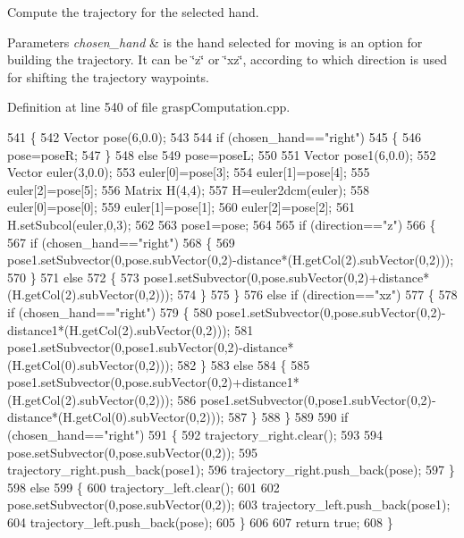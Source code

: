 Compute the trajectory for the selected hand. 


\begin{DoxyParams}{Parameters}
{\em chosen\+\_\+hand} & is the hand selected for moving  is an option for building the trajectory. It can be \char`\"{}z\char`\"{} or \char`\"{}xz\char`\"{}, according to which direction is used for shifting the trajectory waypoints. \\
\hline
\end{DoxyParams}


Definition at line 540 of file grasp\+Computation.\+cpp.


\begin{DoxyCode}
541 \{
542     Vector pose(6,0.0);
543 
544     \textcolor{keywordflow}{if} (chosen\_hand==\textcolor{stringliteral}{"right"})
545     \{
546         pose=poseR;
547     \}
548     \textcolor{keywordflow}{else}
549         pose=poseL;
550 
551     Vector pose1(6,0.0);
552     Vector euler(3,0.0);
553     euler[0]=pose[3];
554     euler[1]=pose[4];
555     euler[2]=pose[5];
556     Matrix H(4,4);
557     H=euler2dcm(euler);
558     euler[0]=pose[0];
559     euler[1]=pose[1];
560     euler[2]=pose[2];
561     H.setSubcol(euler,0,3);
562 
563     pose1=pose;
564 
565     \textcolor{keywordflow}{if} (direction==\textcolor{stringliteral}{"z"})
566     \{
567         \textcolor{keywordflow}{if} (chosen\_hand==\textcolor{stringliteral}{"right"})
568         \{
569             pose1.setSubvector(0,pose.subVector(0,2)-distance*(H.getCol(2).subVector(0,2)));
570         \}
571         \textcolor{keywordflow}{else}
572         \{
573             pose1.setSubvector(0,pose.subVector(0,2)+distance*(H.getCol(2).subVector(0,2)));
574         \}
575     \}
576     \textcolor{keywordflow}{else} \textcolor{keywordflow}{if} (direction==\textcolor{stringliteral}{"xz"})
577     \{
578         \textcolor{keywordflow}{if} (chosen\_hand==\textcolor{stringliteral}{"right"})
579         \{
580             pose1.setSubvector(0,pose.subVector(0,2)-distance1*(H.getCol(2).subVector(0,2)));
581             pose1.setSubvector(0,pose1.subVector(0,2)-distance*(H.getCol(0).subVector(0,2)));
582         \}
583         \textcolor{keywordflow}{else}
584         \{
585             pose1.setSubvector(0,pose.subVector(0,2)+distance1*(H.getCol(2).subVector(0,2)));
586             pose1.setSubvector(0,pose1.subVector(0,2)-distance*(H.getCol(0).subVector(0,2)));
587         \}
588     \}
589 
590     \textcolor{keywordflow}{if} (chosen\_hand==\textcolor{stringliteral}{"right"})
591     \{
592         trajectory\_right.clear();
593 
594         pose.setSubvector(0,pose.subVector(0,2));
595         trajectory\_right.push\_back(pose1);
596         trajectory\_right.push\_back(pose);
597     \}
598     \textcolor{keywordflow}{else}
599     \{
600         trajectory\_left.clear();
601 
602         pose.setSubvector(0,pose.subVector(0,2));
603         trajectory\_left.push\_back(pose1);
604         trajectory\_left.push\_back(pose);
605     \}
606 
607     \textcolor{keywordflow}{return} \textcolor{keyword}{true};
608 \}
\end{DoxyCode}
